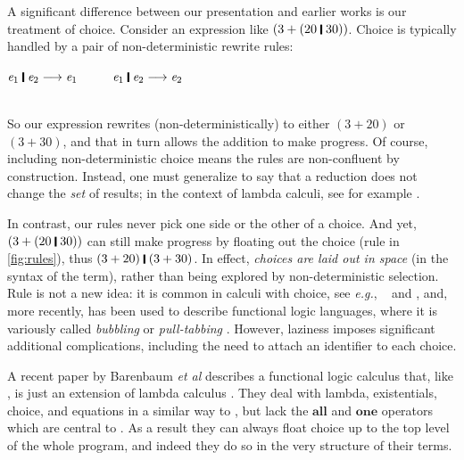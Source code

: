 \documentclass[acmsmall]{acmart}
\newcommand{\Varid}[1]{\mathit{#1}}
\newcommand{\eg}{\emph{e.g.}\xspace}
\begin{document}
A significant difference between our presentation and earlier works is our
treatment of choice. Consider an expression like \ensuremath{(\mathrm{3}\mathbin{+}(\mathrm{20}\;\rule[-0.1em]{0.15em}{0.75em}\;\mathrm{30}))}.
Choice is typically handled by a pair of non-deterministic rewrite rules:
\\
\centerline{$\ensuremath{\Varid{e}_{\mathrm{1}}\;\rule[-0.1em]{0.15em}{0.75em}\;\Varid{e}_{\mathrm{2}}} \movesto \ensuremath{\Varid{e}_{\mathrm{1}}} \hspace{1cm} \ensuremath{\Varid{e}_{\mathrm{1}}\;\rule[-0.1em]{0.15em}{0.75em}\;\Varid{e}_{\mathrm{2}}} \movesto \ensuremath{\Varid{e}_{\mathrm{2}}}$}
\\[0.3em]
So our expression rewrites (non-deterministically) to either \ensuremath{(\mathrm{3}\mathbin{+}\mathrm{20})} or \ensuremath{(\mathrm{3}\mathbin{+}\mathrm{30})},
and that in turn allows the addition to make progress.
Of course, including non-deterministic choice means the rules are non-confluent by
construction.  Instead, one must generalize to say that a reduction does not change the
\emph{set} of results; in the context of lambda calculi, see
for example \citet{schmidt-schauss:non-det1,schmidt-schauss:non-det2}.

In contrast, our rules never pick one side or the other of a choice.
And yet, \ensuremath{(\mathrm{3}\mathbin{+}(\mathrm{20}\;\rule[-0.1em]{0.15em}{0.75em}\;\mathrm{30}))} can still make progress by floating out the
choice (rule  in \cref{fig:rules}), thus
\ensuremath{(\mathrm{3}\mathbin{+}\mathrm{20})\;\rule[-0.1em]{0.15em}{0.75em}\;(\mathrm{3}\mathbin{+}\mathrm{30})}.
In effect, \emph{choices are laid out in space} (in
the syntax of the term), rather than being explored by
non-deterministic selection.  Rule  is not a new idea:
it is common in calculi with choice,
see {\eg}, ~\citet[Section 6.1]{liguoro:non-det} and \citet[Section 3]{lago:probabilistic},
and, more recently, has been used to describe functional logic languages, where it is variously
called \emph{bubbling} \cite{antoy:bubbling} or \emph{pull-tabbing} \cite{antoy:pull-tabbing}.
However, laziness imposes significant additional complications, including the need to attach
an identifier to each choice.

A recent paper by Barenbaum \emph{et al} describes a functional logic calculus that, like \versecalc{},
is just an extension of lambda calculus \cite{barenbaum:relational}.
They deal with lambda, existentials, choice, and equations
in a similar way to \versecalc{}, but lack the \ensuremath{\textbf{all}} and \ensuremath{\textbf{one}} operators which are central to \versecalc{}.
As a result they can always float choice up to the top level of the whole program, and
indeed they do so in the very structure of their terms.
\end{document}
